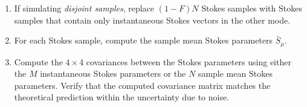 \documentclass[preprint]{aastex6}
\newcommand{\irow}{\mu} \newcommand{\icol}{\nu}
\begin{document}
\begin{enumerate}
\item If simulating \emph{disjoint samples}, replace $(1-F)N$ Stokes
  samples with Stokes samples that contain only instantaneous
  Stokes vectors in the other mode.

\item For each Stokes sample, compute the sample mean Stokes
  parameters $\bar{S}_\irow$.

\item Compute the $4\times4$ covariances between the Stokes parameters
  using either the $M$ instantaneous Stokes parameters or the $N$
  sample mean Stokes parameters.  Verify that the computed covariance
  matrix matches the theoretical prediction within the uncertainty due
  to noise.
  
\end{enumerate}
%




\end{document}
